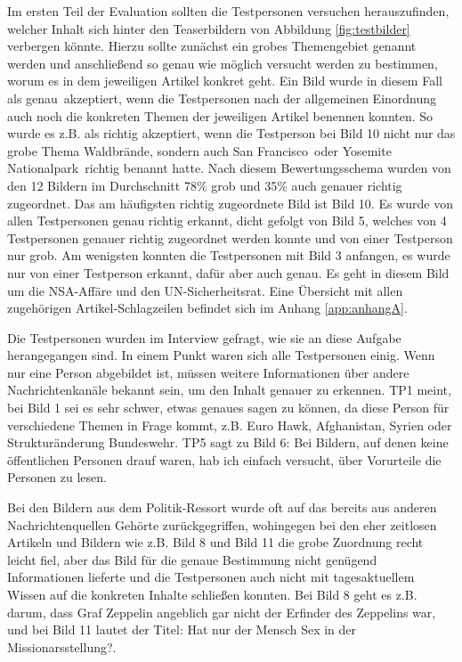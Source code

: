 \documentclass[12pt,a4paper,bibtotoc,abstracton]{scrartcl}
\begin{document}
Im ersten Teil der Evaluation sollten die Testpersonen versuchen herauszufinden, welcher Inhalt sich hinter den Teaserbildern von Abbildung \ref{fig:testbilder} verbergen könnte. Hierzu sollte zunächst ein grobes Themengebiet genannt werden und anschließend so genau wie möglich versucht werden zu bestimmen, worum es in dem jeweiligen Artikel konkret geht. Ein Bild wurde in diesem Fall als \glqq genau\grqq\ akzeptiert, wenn die Testpersonen nach der allgemeinen Einordnung auch noch die konkreten Themen der jeweiligen Artikel benennen konnten. So wurde es z.B. als richtig akzeptiert, wenn die Testperson bei Bild 10 nicht nur das grobe Thema \glqq Waldbrände\grqq, sondern auch \glqq San Francisco\grqq\ oder \glqq Yosemite Nationalpark\grqq\ richtig benannt hatte. Nach diesem Bewertungsschema wurden von den 12 Bildern im Durchschnitt 78\% grob und 35\% auch genauer richtig zugeordnet. Das am häufigsten richtig zugeordnete Bild ist Bild 10. Es wurde von allen Testpersonen genau richtig erkannt, dicht gefolgt von Bild 5, welches von 4 Testpersonen genauer richtig zugeordnet werden konnte und von einer Testperson nur grob. Am wenigsten konnten die Testpersonen mit Bild 3 anfangen, es wurde nur von einer Testperson erkannt, dafür aber auch genau. Es geht in diesem Bild um die NSA-Affäre und den UN-Sicherheitsrat. Eine Übersicht mit allen zugehörigen Artikel-Schlagzeilen befindet sich im Anhang \ref{app:anhangA}.

Die Testpersonen wurden im Interview gefragt, wie sie an diese Aufgabe herangegangen sind. In einem Punkt waren sich alle Testpersonen einig. Wenn nur eine Person abgebildet ist, müssen weitere Informationen über andere Nachrichtenkanäle bekannt sein, um den Inhalt genauer zu erkennen. TP1 meint, bei Bild 1 sei es sehr schwer, etwas genaues sagen zu können, da diese Person für verschiedene Themen in Frage kommt, z.B. Euro Hawk, Afghanistan, Syrien oder Strukturänderung Bundeswehr. TP5 sagt zu Bild 6: \glqq Bei Bildern, auf denen keine öffentlichen Personen drauf waren, hab ich einfach versucht, über Vorurteile die Personen zu lesen\grqq. 

Bei den Bildern aus dem Politik-Ressort wurde oft auf das bereits aus anderen Nachrichtenquellen Gehörte zurückgegriffen, wohingegen bei den eher zeitlosen Artikeln und Bildern wie z.B. Bild 8 und Bild 11 die grobe Zuordnung recht leicht fiel, aber das Bild für die genaue Bestimmung nicht genügend Informationen lieferte und die Testpersonen auch nicht mit tagesaktuellem Wissen auf die konkreten Inhalte schließen konnten. Bei Bild 8 geht es z.B. darum, dass Graf Zeppelin angeblich gar nicht der Erfinder des Zeppelins war, und bei Bild 11 lautet der Titel: \glqq Hat nur der Mensch Sex in der Missionarsstellung?\grqq. 
\end{document}
